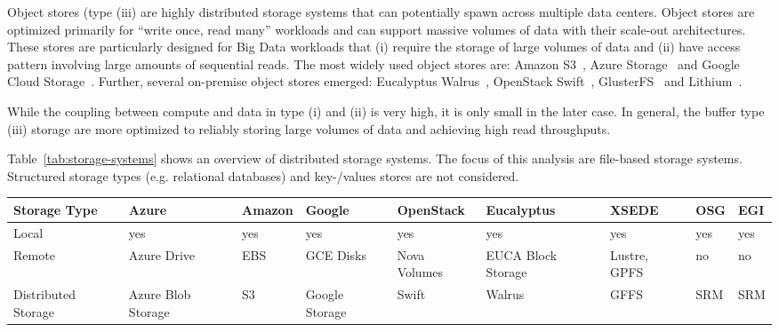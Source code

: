 \documentclass{sig-alternate}
\begin{document}
Object stores (type (iii) are highly distributed storage systems that can
potentially spawn across multiple data centers. Object stores are optimized
primarily for “write once, read many” workloads and can support massive
volumes of data with their scale-out architectures. These stores are
particularly designed for Big Data workloads that (i) require the storage of
large volumes of data and (ii) have access pattern involving large amounts of
sequential reads. The most widely used object stores are: Amazon
S3~\cite{amazons3}, Azure Storage~\cite{azure-blob-storage} and Google Cloud
Storage~\cite{google-storage}. Further, several on-premise object stores
emerged: Eucalyptus Walrus~\cite{walrus}, OpenStack
Swift~\cite{openstack-swift}, GlusterFS~\cite{glusterfs} and
Lithium~\cite{Hansen:2010:LVM:1807128.1807134}.




While the coupling between compute and data in type (i) and (ii) is very high,
it is only small in the later case. In general, the buffer type (iii) storage
are more optimized to reliably storing large volumes of data and achieving
high read throughputs.


Table~\ref{tab:storage-systems} shows an overview of distributed storage 
systems. The focus of this analysis are file-based storage systems. Structured
storage types (e.g. relational databases) and key-/values stores are not 
considered.

\begin{table*}[t]
\centering
\begin{tabular}{|p{1.7cm}|p{1.3cm}|p{1.3cm}|p{1.3cm}|p{1.4cm}|p{1.4cm}|p{1.3cm}|p{1.2cm}|p{1.2cm}|}
	\hline
	\textbf{Storage Type} &\textbf{Azure} &\textbf{Amazon} &\textbf{Google} &\textbf{Open\-Stack} &\textbf{Euca\-lyptus} &\textbf{XSEDE}  &\textbf{OSG} &\textbf{EGI} \\
	\hline
	Local	&yes &yes &yes &yes &yes &yes &yes &yes\\
	\hline
	Remote &Azure Drive &EBS &GCE Disks &Nova Volumes &EUCA Block Storage &Lustre, GPFS 
	&no &no\\
	\hline
	Distributed Storage &Azure Blob Storage &S3 &Google Storage &Swift & Walrus &GFFS
	 &SRM &SRM\\
	\hline	
\end{tabular}
\caption{\textbf{Storage Types Supported by the Different Infrastructures:} 
Each infrastructure supports various storage options. Most commonly, storage 
is mounted as a local or remote filesystem. Distributed object storage 
provides some interesting characteristics for data-intensive applications. 
\label{tab:storage-systems}}
\end{table*}
\end{document}
